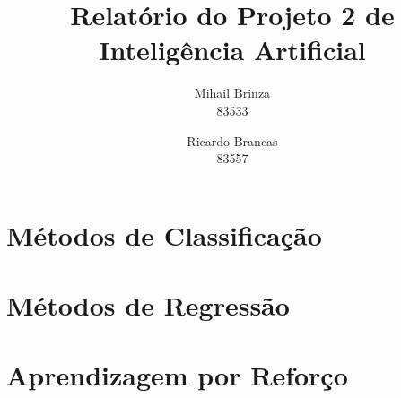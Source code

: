 \documentclass[a4paper]{article}
\title{\LARGE \textbf{Relatório do Projeto 2 de Inteligência Artificial}}
\author{Mihail Brinza \\ \scriptsize 83533 \normalsize \and Ricardo Brancas \\ \scriptsize 83557 \normalsize}
\begin{document}
    \maketitle

    \begin{multicols}{2}
    \section{Métodos de Classificação}

    \section{Métodos de Regressão}

    \section{Aprendizagem por Reforço}

    \end{multicols}
\end{document}
